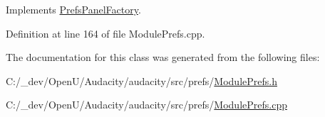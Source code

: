 Implements \hyperlink{class_prefs_panel_factory_a4814184d6050665a43f4929caa73aa0c}{Prefs\+Panel\+Factory}.



Definition at line 164 of file Module\+Prefs.\+cpp.



The documentation for this class was generated from the following files\+:\begin{DoxyCompactItemize}
\item 
C\+:/\+\_\+dev/\+Open\+U/\+Audacity/audacity/src/prefs/\hyperlink{_module_prefs_8h}{Module\+Prefs.\+h}\item 
C\+:/\+\_\+dev/\+Open\+U/\+Audacity/audacity/src/prefs/\hyperlink{_module_prefs_8cpp}{Module\+Prefs.\+cpp}\end{DoxyCompactItemize}
